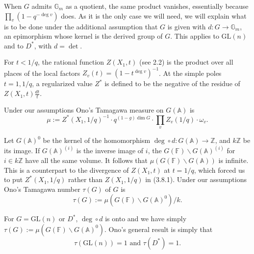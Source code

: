 \documentclass[11pt,a4paper]{article}
\theoremstyle{plain}
\theoremstyle{definition}
\newcommand{\Z}{\mathbb{Z}}
\newcommand{\Gm}{\mathbb{G}_m}
\newcommand{\GL}{\mathrm{GL}}
\begin{document}
When $G$ admits $\Gm$ as a quotient, the same product vanishes, essentially because $\prod_v (1 - q^{-\deg v})$ does. As it is the only case we will need, we will explain what is to be done under the additional assumption that $G$ is given with $d: G \to \Gm$, an epimorphism whose kernel is the derived group of $G$. This applies to $\GL(n)$ and to $D^*$, with $d = \det$.

For $t < 1/q$, the rational function $Z(X_1,t)$ (see 2.2) is the product over all places of the local factors $Z_v(t) = (1 - t^{\deg v})^{-1}$. At the simple poles $t=1, 1/q$, a regularized value $Z^*$ is defined to be the negative of the residue of $Z(X_1,t) \frac{dt}{t}$.

Under our assumptions Ono's Tamagawa measure on $G(\mathbb{A})$ is
\begin{equation}
\mu := Z^*(X_1, 1/q)^{-1} \cdot q^{(1-g)\dim G} \cdot \prod_v Z_v(1/q) \cdot \omega_v. \tag{3.8.1}
\end{equation}

Let $G(\mathbb{A})^0$ be the kernel of the homomorphism $\deg \circ d: G(\mathbb{A}) \to \Z$, and $k\Z$ be its image. If $G(\mathbb{A})^{(i)}$ is the inverse image of $i$, the $G(\mathbb{F}) \backslash G(\mathbb{A})^{(i)}$ for $i \in k\Z$ have all the same volume. It follows that $\mu(G(\mathbb{F}) \backslash G(\mathbb{A}))$ is infinite. This is a counterpart to the divergence of $Z(X_1,t)$ at $t=1/q$, which forced us to put $Z^*(X_1,1/q)$ rather than $Z(X_1,1/q)$ in (3.8.1). Under our assumptions Ono's Tamagawa number $\tau(G)$ of $G$ is
\begin{equation}
\tau(G) := \mu(G(\mathbb{F}) \backslash G(\mathbb{A})^0) / k.
\end{equation}

For $G = \GL(n)$ or $D^*$, $\deg \circ d$ is onto and we have simply $\tau(G) := \mu(G(\mathbb{F}) \backslash G(\mathbb{A})^0)$. Ono's general result is simply that
\begin{equation}
\tau(\GL(n)) = 1 \text{ and } \tau(D^*) = 1. \tag{3.8.3}
\end{equation}
\end{document}
